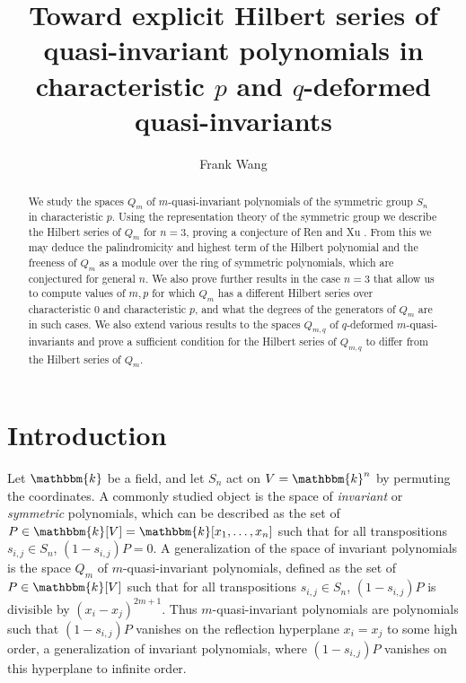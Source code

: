 \documentclass[11pt]{article}
\title{Toward explicit Hilbert series of quasi-invariant polynomials in characteristic $p$ and $q$-deformed quasi-invariants}
\author{Frank Wang}
\date{\vspace{-5ex}}
\theoremstyle{definition}
\renewcommand{\k}{\mathbbm{k}}
\begin{document}
\maketitle
\begin{abstract}
    We study the spaces $Q_m$ of $m$-quasi-invariant polynomials of the symmetric group $S_n$ in characteristic $p$. Using the representation theory of the symmetric group we describe the Hilbert series of $Q_m$ for $n=3$, proving a conjecture of Ren and Xu \cite{Ren_2020}. From this we may deduce the palindromicity and highest term of the Hilbert polynomial and the freeness of $Q_m$ as a module over the ring of symmetric polynomials, which are conjectured for general $n$. We also prove further results in the case $n=3$ that allow us to compute values of $m,p$ for which $Q_m$ has a different Hilbert series over characteristic 0 and characteristic $p$, and what the degrees of the generators of $Q_m$ are in such cases. We also extend various results to the spaces $Q_{m,q}$ of $q$-deformed $m$-quasi-invariants and prove a sufficient condition for the Hilbert series of $Q_{m,q}$ to differ from the Hilbert series of $Q_m$.
\end{abstract}

\section{Introduction}
Let $\k$ be a field, and let $S_n$ act on $V=\k^n$ by permuting the coordinates. A commonly studied object is the space of \textit{invariant} or \textit{symmetric} polynomials, which can be described as the set of $P\in\k[V]=\k[x_1,\dots,x_n]$ such that for all transpositions $s_{i,j}\in S_n$, $(1-s_{i,j})P=0$. A generalization of the space of invariant polynomials is the space $Q_m$ of $m$-quasi-invariant polynomials, defined as the set of $P\in\k[V]$ such that for all transpositions $s_{i,j}\in S_n$, $(1-s_{i,j})P$ is divisible by $(x_i-x_j)^{2m+1}$. Thus $m$-quasi-invariant polynomials are polynomials such that $(1-s_{i,j})P$ vanishes on the reflection hyperplane $x_i=x_j$ to some high order, a generalization of invariant polynomials, where $(1-s_{i,j})P$ vanishes on this hyperplane to infinite order.
\end{document}
